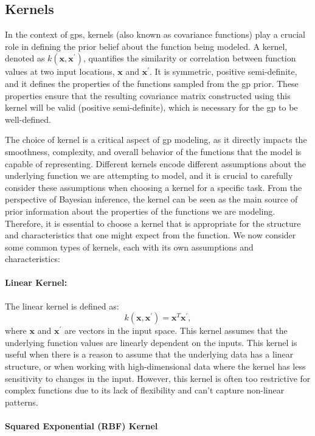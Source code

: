 \subsection{Kernels}
\label{section:kernels}
In the context of \acfp{gp}, kernels (also known as covariance functions) play a crucial role in defining the prior belief about the function being modeled. A kernel, denoted as $k(\mathbf{x}, \mathbf{x}^\prime)$, quantifies the similarity or correlation between function values at two input locations, $\mathbf{x}$ and $\mathbf{x}^\prime$. It is symmetric, positive semi-definite, and it defines the properties of the functions sampled from the \ac{gp} prior. These properties ensure that the resulting covariance matrix constructed using this kernel will be valid (positive semi-definite), which is necessary for the \ac{gp} to be well-defined.

The choice of kernel is a critical aspect of \ac{gp} modeling, as it directly impacts the smoothness, complexity, and overall behavior of the functions that the model is capable of representing. Different kernels encode different assumptions about the underlying function we are attempting to model, and it is crucial to carefully consider these assumptions when choosing a kernel for a specific task. From the perspective of Bayesian inference, the kernel can be seen as the main source of prior information about the properties of the functions we are modeling. Therefore, it is essential to choose a kernel that is appropriate for the structure and characteristics that one might expect from the function. We now consider some common types of kernels, each with its own assumptions and characteristics:

\paragraph{Linear Kernel:}
The linear kernel is defined as:
\[k(\mathbf{x}, \mathbf{x}^\prime) = \mathbf{x}^T \mathbf{x}^\prime,\]
where $\mathbf{x}$ and $\mathbf{x}^\prime$ are vectors in the input space. This kernel assumes that the underlying function values are linearly dependent on the inputs. This kernel is useful when there is a reason to assume that the underlying data has a linear structure, or when working with high-dimensional data where the kernel has less sensitivity to changes in the input. However, this kernel is often too restrictive for complex functions due to its lack of flexibility and can't capture non-linear patterns. 

\paragraph{Squared Exponential (RBF) Kernel}

